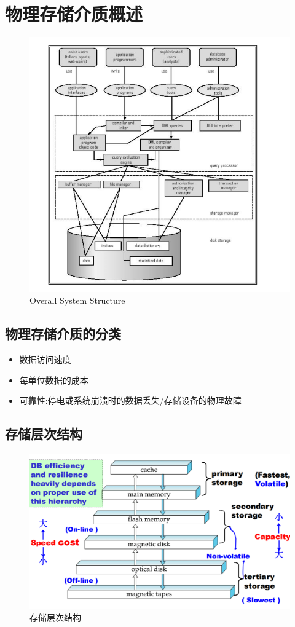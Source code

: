 \section{物理存储介质概述}

\begin{figure}[H]
    \centering
    \includegraphics[width=0.9\linewidth]{image1.png}
    \caption{Overall System Structure}
    \label{}
\end{figure}

\subsection{物理存储介质的分类}

\begin{itemize}
    \item 数据访问速度
    \item 每单位数据的成本
    \item 可靠性:停电或系统崩溃时的数据丢失/存储设备的物理故障
\end{itemize}

\subsection{存储层次结构}

\begin{figure}[H]
    \centering
    \includegraphics[width=0.9\linewidth]{image2.png}
    \caption{存储层次结构}
    \label{}
\end{figure}

